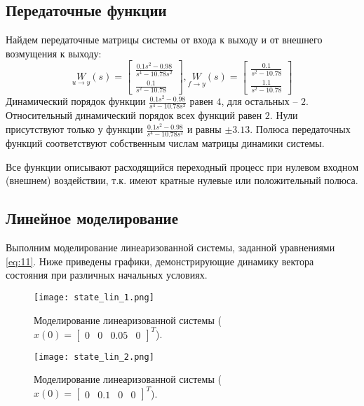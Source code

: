 \subsection{Передаточные функции}
Найдем передаточные матрицы системы от входа к выходу и от внешнего возмущения к выходу:
\begin{equation*}
    \underset{u\to y}{W}(s) = \begin{bmatrix}
        \frac{0.1s^2 - 0.98}{s^4 - 10.78s^2} \\
        \frac{0.1}{s^2 - 10.78}
    \end{bmatrix}, 
    \underset{f\to y}{W}(s) = \begin{bmatrix}
        \frac{0.1}{s^2 - 10.78} \\
        \frac{1.1}{s^2 - 10.78}
    \end{bmatrix}
\end{equation*}
Динамический порядок функции $\frac{0.1s^2 - 0.98}{s^4 - 10.78s^2}$ равен $4$, для остальных -- $2$. Относительный динамический порядок всех функций равен $2$.
Нули присутствуют только у функции $\frac{0.1s^2 - 0.98}{s^4 - 10.78s^2}$ и равны $\pm 3.13$. Полюса передаточных функций соответствуют собственным числам матрицы динамики системы.

Все функции описывают расходящийся переходный процесс при нулевом входном (внешнем) воздействии, т.к. имеют кратные нулевые или положительный полюса.

\subsection{Линейное моделирование}
Выполним моделирование линеаризованной системы, заданной уравнениями \ref{eq:11}.
Ниже приведены графики, демонстрирующие динамику вектора состояния при различных начальных условиях.

\begin{figure}[]
    \centering
    \texttt{[image: state\_lin\_1.png]}
    \caption{\label{fig:task2_3_1}Моделирование линеаризованной системы ($x(0)=\begin{bmatrix}
        0 & 0 & 0.05 & 0
    \end{bmatrix}^T$).}
\end{figure}

\begin{figure}[]
    \centering
    \texttt{[image: state\_lin\_2.png]}
    \caption{\label{fig:task2_3_2}Моделирование линеаризованной системы ($x(0)=\begin{bmatrix}
        0 & 0.1 & 0 & 0
    \end{bmatrix}^T$).}
\end{figure}


